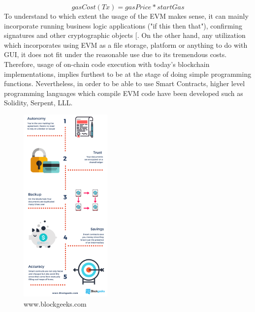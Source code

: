 				\[ gasCost(Tx)= {gasPrice *  startGas}\]
To understand to which extent the usage of the EVM makes sense, it can mainly incorporate running business logic applications ("if this then that"), confirming signatures and other cryptographic objects [\cite{Ethereum2017}. On the other hand, any utilization which incorporates using EVM as a file storage, platform or anything to do with GUI, it does not fit under the reasonable use due to its tremendous costs. Therefore, usage of on-chain code execution with today's blockchain implementations, implies furthest to be at the stage of doing simple programming functions. Nevertheless, in order to be able to use Smart Contracts, higher level programming languages which compile EVM code have been developed such as Solidity, Serpent, LLL.



\begin{figure}[h]
\centering
\includegraphics[width=0.4\textwidth]{images/smartcontracts.png}
\caption{\label{fig:Smartcontracts}www.blockgeeks.com}
\end{figure}



